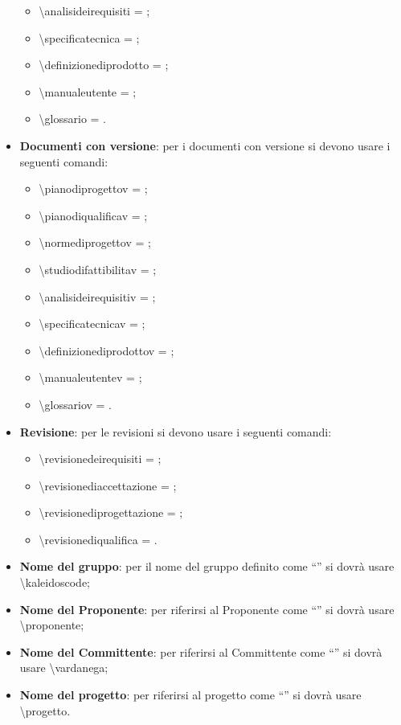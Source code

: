 \documentclass[../NormeDiProgetto.tex]{subfiles}
\begin{document}
\begin{itemize}
\begin{itemize}
							\item \textbackslash analisideirequisiti = \analisideirequisiti;
							\item \textbackslash specificatecnica = \specificatecnica;
							\item \textbackslash definizionediprodotto = ;
							\item \textbackslash manualeutente = \manualeutente;
							\item \textbackslash glossario = \glossario.
						\end{itemize}	
						\item \textbf{Documenti con versione}: per i documenti con versione si
						devono usare i seguenti comandi:
						\begin{itemize}
							\item \textbackslash pianodiprogettov = \pianodiprogettov;
							\item \textbackslash pianodiqualificav = \pianodiqualificav;
							\item \textbackslash normediprogettov = \normediprogettov;
							\item \textbackslash studiodifattibilitav = \studiodifattibilitav;
							\item \textbackslash analisideirequisitiv = \analisideirequisitiv;
							\item \textbackslash specificatecnicav = \specificatecnicav;
							\item \textbackslash definizionediprodottov = ;
							\item \textbackslash manualeutentev = \manualeutentev;
							\item \textbackslash glossariov = \glossariov.
						\end{itemize}	
						\item \textbf{Revisione}: per le revisioni si devono usare i seguenti
						comandi:
						\begin{itemize}
							\item \textbackslash revisionedeirequisiti = \revisionedeirequisiti;
							\item \textbackslash revisionediaccettazione =
							\revisionediaccettazione;
							\item \textbackslash revisionediprogettazione =
							\revisionediprogettazione;
							\item \textbackslash revisionediqualifica = \revisionediqualifica.		
						\end{itemize}
						\item \textbf{Nome del gruppo}: per il nome del gruppo definito come
						``\kaleidoscode '' si dovrà usare \textbackslash kaleidoscode;
						\item \textbf{Nome del Proponente}: per riferirsi al Proponente come
						``\proponente '' si dovrà usare \textbackslash proponente;	
						\item \textbf{Nome del Committente}: per riferirsi al Committente come
						``\vardanega ''  si dovrà usare \textbackslash vardanega;
						\item \textbf{Nome del progetto}: per riferirsi al progetto come
						``\progetto '' si dovrà usare \textbackslash progetto.
					\end{itemize}
\end{document}
